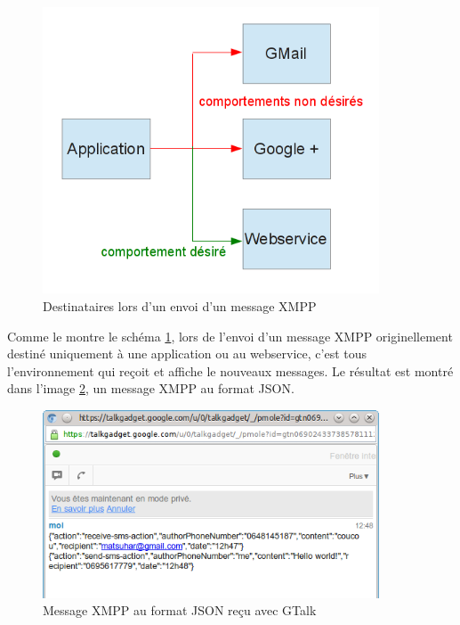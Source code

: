 \begin{figure}[!h]
	\center
	\includegraphics[width=10cm]{img/broadcast-xmpp.png}
	\caption{Destinataires lors d'un envoi d'un message XMPP}
	\label{broadcast-xmpp}
\end{figure}

Comme le montre le schéma \ref{broadcast-xmpp}, lors de l'envoi d'un message XMPP originellement destiné uniquement à une application ou au webservice, c'est tous l'environnement qui reçoit et affiche le nouveaux messages.
Le résultat est montré dans l'image \ref{message-xmpp-json-gmail}, un message XMPP au format JSON. 
	
\begin{figure}[!h]
	\center
	\includegraphics[width=10cm]{img/message-xmpp-json-gmail.png}
	\caption{Message XMPP au format JSON reçu avec GTalk}
	\label{message-xmpp-json-gmail}
\end{figure}






